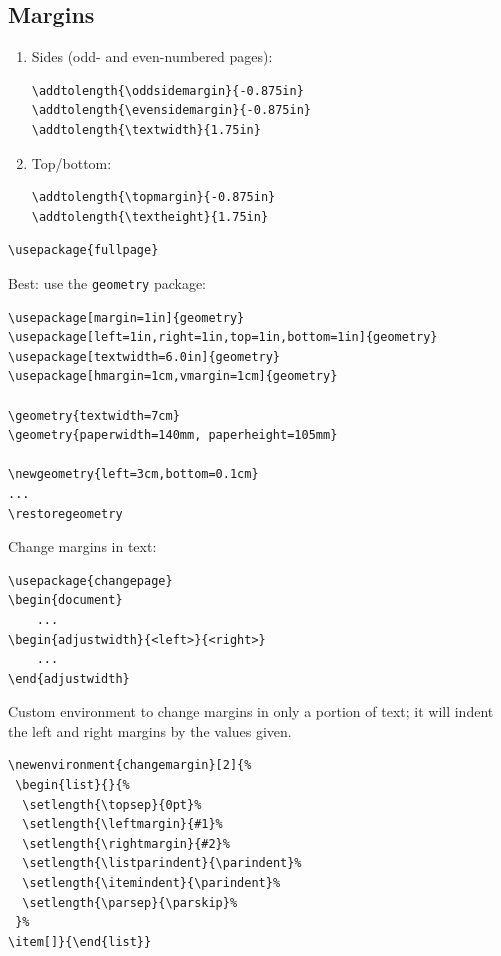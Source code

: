 \documentclass{article}
\begin{document}
\subsection{Margins}
\begin{enumerate}
    \item Sides (odd- and even-numbered pages):
\begin{lstlisting}
\addtolength{\oddsidemargin}{-0.875in}
\addtolength{\evensidemargin}{-0.875in}
\addtolength{\textwidth}{1.75in}
\end{lstlisting}
    \item Top/bottom:
\begin{lstlisting}
\addtolength{\topmargin}{-0.875in}
\addtolength{\textheight}{1.75in}
\end{lstlisting}
\end{enumerate}

\begin{lstlisting}
\usepackage{fullpage}
\end{lstlisting}

Best: use the \verb|geometry| package:
\begin{lstlisting}
\usepackage[margin=1in]{geometry}
\usepackage[left=1in,right=1in,top=1in,bottom=1in]{geometry}
\usepackage[textwidth=6.0in]{geometry}
\usepackage[hmargin=1cm,vmargin=1cm]{geometry}

\geometry{textwidth=7cm}
\geometry{paperwidth=140mm, paperheight=105mm}

\newgeometry{left=3cm,bottom=0.1cm}
...
\restoregeometry
\end{lstlisting}


Change margins in text:
\begin{lstlisting}
\usepackage{changepage}
\begin{document}
    ...
\begin{adjustwidth}{<left>}{<right>}
    ...
\end{adjustwidth}
\end{lstlisting}

Custom environment to change margins in only a portion of text;
it will indent the left and right margins by the values given.
\begin{lstlisting}
\newenvironment{changemargin}[2]{%
 \begin{list}{}{%
  \setlength{\topsep}{0pt}%
  \setlength{\leftmargin}{#1}%
  \setlength{\rightmargin}{#2}%
  \setlength{\listparindent}{\parindent}%
  \setlength{\itemindent}{\parindent}%
  \setlength{\parsep}{\parskip}%
 }%
\item[]}{\end{list}}
\end{lstlisting}
\end{document}
